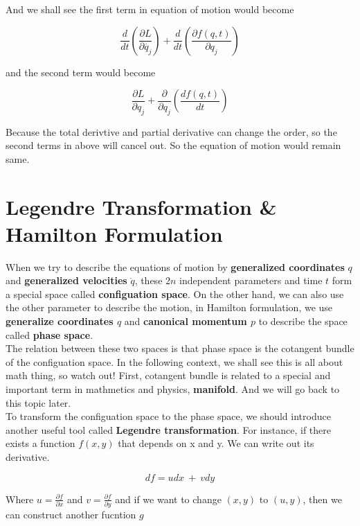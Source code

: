 \documentclass[12pt]{article}
\numberwithin{equation}{section}
\begin{document}
And we shall see the first term in equation of motion would become

\begin{center}
    \[ \frac{d}{dt} \left( \frac{ \partial{L} }{\partial{\dot{q_j}}} \right) + \frac{d}{dt} \left(\frac{ \partial{f(q, t)} }{ \partial{q_j} } \right) \]
\end{center}

and the second term would become

\begin{center}
    \[  \frac{ \partial{L} }{ \partial{q_j} } + \frac{ \partial }{ \partial{q_j} } \left( \frac{df(q,t)}{dt} \right) \]    
\end{center}

Because the total derivtive and partial derivative can change the order, so the second terms in above will cancel out. So the equation of motion would remain same.

\section{Legendre Transformation \& Hamilton Formulation}
When we try to describe the equations of motion by \textbf{generalized coordinates} $q$ and \textbf{generalized velocities} $\dot{q}$, these $2n$ independent parameters  and time $t$ form a special space called \textbf{configuation space}.
On the other hand, we can also use the other parameter to describe the motion, in Hamilton formulation, we use \textbf{generalize coordinates $q$} and \textbf{canonical momentum $p$} to describe the space called \textbf{phase space}.
\\
The relation between these two spaces is that phase space is the cotangent bundle of the configuation space. In the following context, we shall see this is all about math thing, so watch out!
First, cotangent bundle is related to a special and important term in mathmetics and physics, \textbf{manifold}. And we will go back to this topic later.
\\
To transform the configuation space to the phase space, we should introduce another useful tool called \textbf{Legendre transformation}.
For instance, if there exists a function $f(x,y)$ that depends on x and y. We can write out its derivative.

\begin{center}
    \[ df = udx\ +\ vdy\]
\end{center}

Where $u = \frac{\partial{f}}{\partial{x}}$ and $ v = \frac{\partial{f}}{\partial{y}}$
and if we want to change $(x, y)$ to $(u, y)$, then we can construct another fucntion $g$
\end{document}
